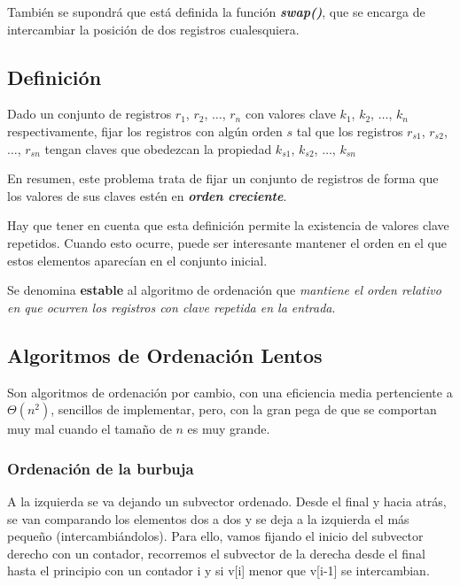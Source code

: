 \documentclass[10pt,a4paper,spanish]{report}
\theoremstyle{definition}
\theoremstyle{remark}
\begin{document}
También se supondrá que está definida la función \textit{\textbf{\textcolor[rgb]{0.2,0.5,0.5}{swap()}}}, que se encarga de intercambiar la posición de dos registros cualesquiera.

\subsection{\textcolor[rgb]{0.2,0.5,0.5}Definición}

Dado un conjunto de registros $r_1$, $r_2$, $\ldots$, $r_n$ con valores clave $k_1$, $k_2$, $\ldots$, $k_n$ respectivamente, fijar los registros con algún orden $s$ tal que los registros $r_{s1}$, $r_{s2}$, $\ldots$, $r_{sn}$ tengan claves que obedezcan la propiedad $k_{s1}$, $k_{s2}$, $\ldots$, $k_{sn}$

En resumen, este problema trata de fijar un conjunto de registros de forma que los valores de sus claves estén en \textit{\textbf{\textcolor[rgb]{0.2,0.5,0.5}{orden creciente}}}.

Hay que tener en cuenta que esta definición permite la existencia de valores clave repetidos. Cuando esto ocurre, puede ser interesante mantener el orden en el que estos elementos aparecían en el conjunto inicial.

Se denomina \textbf{\textcolor[rgb]{0.2,0.5,0.5}{estable}} al algoritmo de ordenación que \textit{mantiene el orden relativo en que ocurren los registros con clave repetida en la entrada}.

\subsection{\textcolor[rgb]{0.2,0.5,0.5}Algoritmos de Ordenación Lentos}

Son algoritmos de ordenación por cambio, con una eficiencia media pertenciente a $\Theta(n^2)$, sencillos de implementar, pero, con la gran pega de que se comportan muy mal cuando el tamaño de $n$ es muy grande.


\subsubsection{\textcolor[rgb]{0.2,0.5,0.5}Ordenación de la burbuja}

 A la izquierda se va dejando un subvector ordenado. Desde el final y hacia atrás, se van comparando los elementos dos a dos y se deja a la izquierda el más pequeño (intercambiándolos). Para ello, vamos fijando el inicio del subvector derecho con un contador, recorremos el subvector de la derecha desde el final hasta el principio con un contador i y si v[i] menor que v[i-1] se intercambian.
\end{document}
